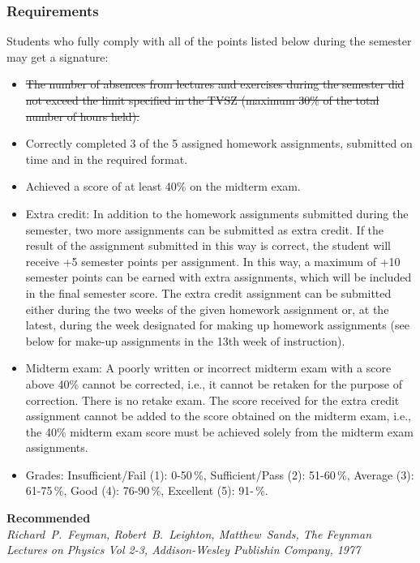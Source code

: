 \documentclass[t,aspectratio=169]{beamer}
\begin{document}

\begin{frame}
\frametitle{Requirements}
Students who fully comply with all of the points listed below during the semester may get a signature:
\begin{itemize}
\setlength{\parskip}{0pt}
\setlength{\itemsep}{0pt}
\item \st{The number of absences from lectures and exercises during the semester did not exceed the limit specified in the TVSZ (maximum 30\% of the total number of hours held).}
\item Correctly completed 3 of the 5 assigned homework assignments, submitted on time and in the required  format.
\item Achieved a score of at least 40\% on the midterm exam.
\item Extra credit: In addition to the homework assignments submitted during the semester, two more assignments can be submitted as extra credit. If the result of the assignment submitted in this way is correct, the student will receive +5 semester points per assignment. In this way, a maximum of +10 semester points can be earned with extra assignments, which will be included in the final semester score. The extra credit assignment can be submitted either during the two weeks of the given homework assignment or, at the latest, during the week designated for making up homework assignments (see below for make-up assignments in the 13th week of instruction).
 \pagebreak
\item Midterm exam: A poorly written or incorrect midterm exam with a score above 40\% cannot be corrected, i.e., it cannot be retaken for the purpose of correction. There is no retake exam. The score received for the extra credit assignment cannot be added to the score obtained on the midterm exam, i.e., the 40\% midterm exam score must be achieved solely from the midterm exam assignments.
\item Grades: Insufficient/Fail (1): 0-50\,\%, Sufficient/Pass (2): 51-60\,\%, Average (3): 61-75\,\%, Good (4): 76-90\,\%, Excellent (5): 91-\,\%.
\end{itemize}
\textbf{Recommended}\\
\textit{Richard~P.~Feyman, Robert~B.~Leighton, Matthew~Sands, The Feynman Lectures on Physics Vol 2-3, Addison-Wesley Publishin Company, 1977}
\end{frame}
\end{document}

